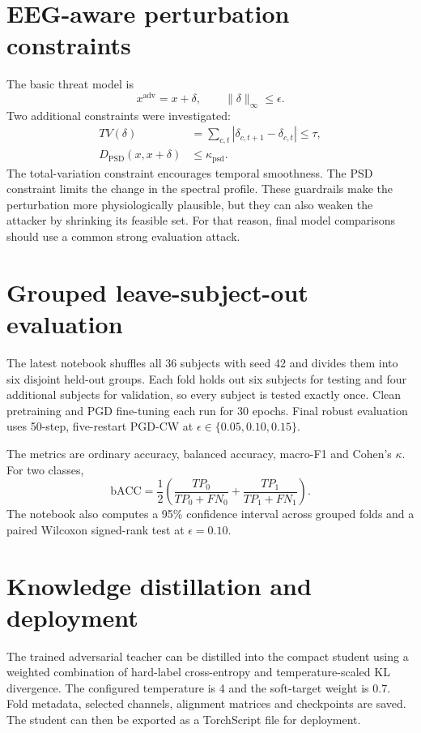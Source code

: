 \documentclass[10pt,a4paper,openright]{report}
\newcommand{\bacc}{\mathrm{bACC}}
\begin{document}
\section{EEG-aware perturbation constraints}
The basic threat model is
\begin{equation}
x^{\mathrm{adv}}=x+\delta, \qquad \|\delta\|_\infty\leq\epsilon.
\end{equation}
Two additional constraints were investigated:
\begin{align}
TV(\delta) &= \sum_{c,t}|\delta_{c,t+1}-\delta_{c,t}|\leq\tau,\\
D_{\mathrm{PSD}}(x,x+\delta) &\leq\kappa_{\mathrm{psd}}.
\end{align}
The total-variation constraint encourages temporal smoothness. The PSD constraint limits the change in the spectral profile. These guardrails make the perturbation more physiologically plausible, but they can also weaken the attacker by shrinking its feasible set. For that reason, final model comparisons should use a common strong evaluation attack.

\section{Grouped leave-subject-out evaluation}
The latest notebook shuffles all 36 subjects with seed 42 and divides them into six disjoint held-out groups. Each fold holds out six subjects for testing and four additional subjects for validation, so every subject is tested exactly once. Clean pretraining and PGD fine-tuning each run for 30 epochs. Final robust evaluation uses 50-step, five-restart PGD-CW at $\epsilon\in\{0.05,0.10,0.15\}$.

The metrics are ordinary accuracy, balanced accuracy, macro-F1 and Cohen's $\kappa$. For two classes,
\begin{equation}
\bacc=\frac{1}{2}\left(\frac{TP_0}{TP_0+FN_0}+\frac{TP_1}{TP_1+FN_1}\right).
\end{equation}
The notebook also computes a 95\% confidence interval across grouped folds and a paired Wilcoxon signed-rank test at $\epsilon=0.10$.

\section{Knowledge distillation and deployment}
The trained adversarial teacher can be distilled into the compact student using a weighted combination of hard-label cross-entropy and temperature-scaled KL divergence. The configured temperature is 4 and the soft-target weight is 0.7. Fold metadata, selected channels, alignment matrices and checkpoints are saved. The student can then be exported as a TorchScript file for deployment.
\end{document}
